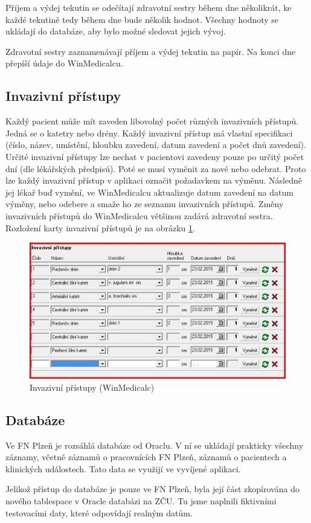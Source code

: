 Příjem a výdej tekutin se odečítají zdravotní sestry během dne několikrát, ke každé tekutině tedy během dne bude několik hodnot. Všechny hodnoty se ukládají do databáze, aby bylo možné sledovat jejich vývoj.

Zdravotní sestry zaznamenávají příjem a výdej tekutin na papír. Na konci dne přepíší údaje do WinMedicalcu.

\subsection{Invazivní přístupy}

Každý pacient může mít zaveden libovolný počet různých invazivních přístupů. Jedná se o katetry nebo drény. Každý invazivní přístup má vlastní specifikaci (číslo, název, umístění, hloubku zavedení, datum zavedení a počet dnů zavedení). Určité invazivní přístupy lze nechat v pacientovi zavedeny pouze po určitý počet dní (dle lékářských předpisů). Poté se musí vyměnit za nové nebo odebrat. Proto lze každý invazivní přístup v aplikaci označit požadavkem na výměnu. Následně jej lékař buď vymění, ve WinMedicalcu aktualizuje datum zavedení na datum výměny, nebo odebere a smaže ho ze seznamu invazivních přístupů. Změny invazivních přístupů do WinMedicalcu většinou zadává zdravotní sestra. Rozložení karty invazivní přístupů je na obrázku \ref{fig:WM_invazivni_pristupy}.

\begin{figure}[H]
	\centering
	\includegraphics[width=1\textwidth]{img/medicalc/WM_invazivni_pristupy.eps}
	\caption{Invazivní přístupy (WinMedicalc)}
  \label{fig:WM_invazivni_pristupy}
\end{figure}


\subsection{Databáze}

Ve FN Plzeň je rozsáhlá databáze od Oraclu. V ní se ukládají prakticky všechny záznamy, včetně záznamů o pracovnících FN Plzeň, záznamů o pacientech a klinických událostech. Tato data se využijí ve vyvíjené aplikaci.

Jelikož přístup do databáze je pouze ve FN Plzeň, byla její část zkopírována do nového tablespace v Oracle databázi na ZČU. Tu jsme naplnili fiktivními testovacími daty, které odpovídají realným datům.